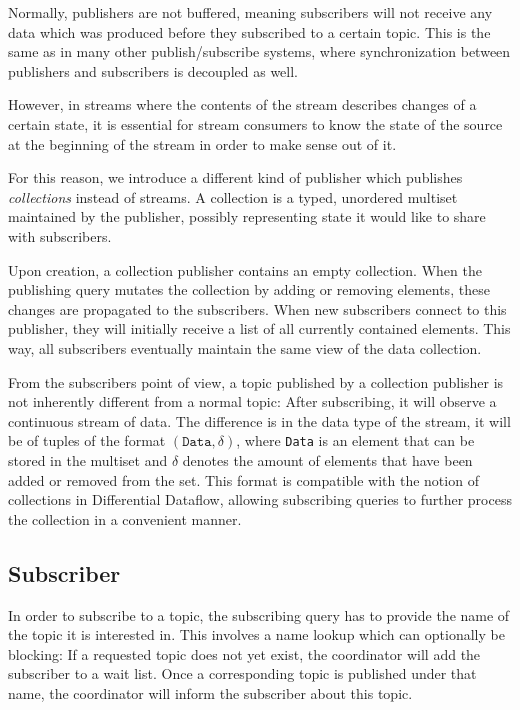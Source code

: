 Normally, publishers are not buffered, meaning subscribers will
not receive any data which was produced before they subscribed to a certain
topic. This is the same as in many other publish/subscribe systems, where
synchronization between publishers and subscribers is decoupled as well. \cite{pubsub}

However, in streams where the contents of the stream describes changes of a certain
state, it is essential for stream consumers to know the state of the source at
the beginning of the stream in order to make sense out of it.

For this reason, we introduce a different kind of publisher which publishes
\emph{collections} instead of streams. A collection is a typed, unordered
multiset maintained by the publisher, possibly representing state it would
like to share with subscribers.

Upon creation, a collection publisher contains an empty collection.
When the publishing query mutates the collection by adding or removing elements,
these changes are propagated to the subscribers. When new subscribers connect
to this publisher, they will initially receive a list of all currently contained
elements. This way, all subscribers eventually maintain the same view of the
data collection.

From the subscribers point of view, a topic published by a collection publisher
is not inherently different from a normal topic: After subscribing, it will
observe a continuous stream of data. The difference is in the data type of the
stream, it will be of tuples of the format $(\texttt{Data}, \delta)$, where
\texttt{Data} is an element that can be stored in the multiset and $\delta$ 
denotes the amount of elements that have been added or removed from the set.
This format
is compatible with the notion of collections in Differential Dataflow, allowing
subscribing queries to further process the collection in a convenient manner.

\subsection{Subscriber}

In order to subscribe to a topic, the subscribing query has to provide the name
of the topic it is interested in. This involves a name lookup which can optionally
be blocking: If a requested topic does not yet exist, the coordinator will add
the subscriber to a wait list. Once a corresponding topic is published under that
name, the coordinator will inform the subscriber about this topic. 


